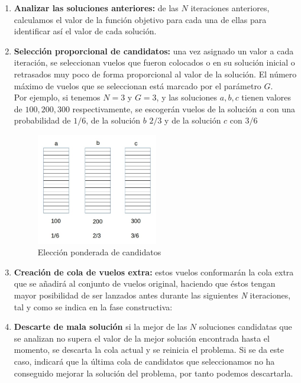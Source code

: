 \begin{enumerate}
	\item \textbf{Analizar las soluciones anteriores:} de las $N$ iteraciones anteriores, calculamos el valor de la función objetivo para cada una de ellas para identificar así el valor de cada solución.
	
	\item \textbf{Selección proporcional de candidatos:} una vez asignado un valor a cada iteración, se seleccionan vuelos que fueron colocados o en su solución inicial o retrasados muy poco de forma proporcional al valor de la solución. El número máximo de vuelos que se seleccionan está marcado por el parámetro $G$.\\
	
	Por ejemplo, si tenemos $N=3$ y $G=3$, y las soluciones $a,b,c$ tienen valores de $100,200,300$ respectivamente, se escogerán vuelos de la solución $a$ con una probabilidad de $1/6$, de la solución $b$ $2/3$ y de la solución $c$ con $3/6$
	\begin{figure}[H]
		\begin{center}
			\centering
			\includegraphics[width=0.5\textwidth]{./imagenes/heuristico/valorSoluciones.jpg}
			\caption{Elección ponderada de candidatos}
			\label{fig: Elección ponderada de candidatos}
		\end{center}
	\end{figure}
	
	\item \textbf{Creación de cola de vuelos extra:} estos vuelos conformarán la cola extra que se añadirá al conjunto de vuelos original, haciendo que éstos tengan mayor posibilidad de ser lanzados antes durante las siguientes \textit{N} iteraciones, tal y como se indica en la fase constructiva:
	
	\item \textbf{Descarte de mala solución} si la mejor de las $N$ soluciones candidatas que se analizan no supera el valor de la mejor solución encontrada hasta el momento, se descarta la cola actual y se reinicia el problema.
	Si se da este caso, indicará que la última cola de candidatos que seleccionamos no ha conseguido mejorar la solución del problema, por tanto podemos descartarla.
\end{enumerate}


